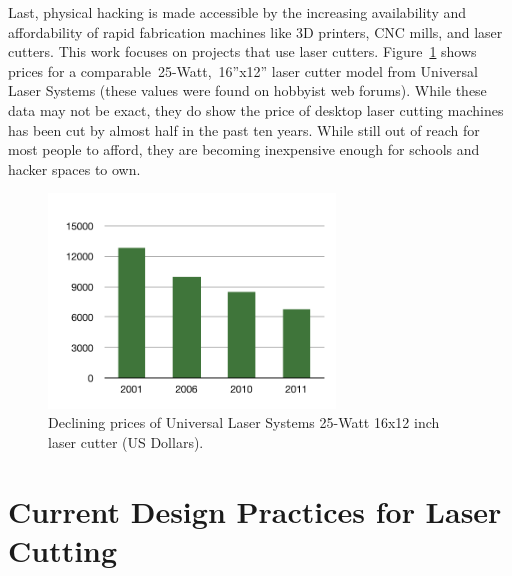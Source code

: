 \documentclass[12pt]{article}
\begin{document}
Last, physical hacking is made accessible by the increasing
availability and affordability of rapid fabrication machines like 3D
printers, CNC mills, and laser cutters. This work focuses on projects
that use laser cutters. Figure~\ref{fig:prices} shows prices for a
comparable~25-Watt,~16''x12'' laser cutter model from Universal Laser
Systems (these values were found on hobbyist web forums). While these
data may not be exact, they do show the price of desktop laser cutting
machines has been cut by almost half in the past ten years. While
still out of reach for most people to afford, they are becoming
inexpensive enough for schools and hacker spaces to own.

%

\begin{figure}[h] %
   \centering
   \includegraphics[width=3in]{img/prices.pdf} 
   \caption{Declining prices of Universal Laser Systems 25-Watt 16x12
     inch laser cutter (US Dollars).}
   \label{fig:prices}
\end{figure}

\section{Current Design Practices for Laser Cutting}
\end{document}
